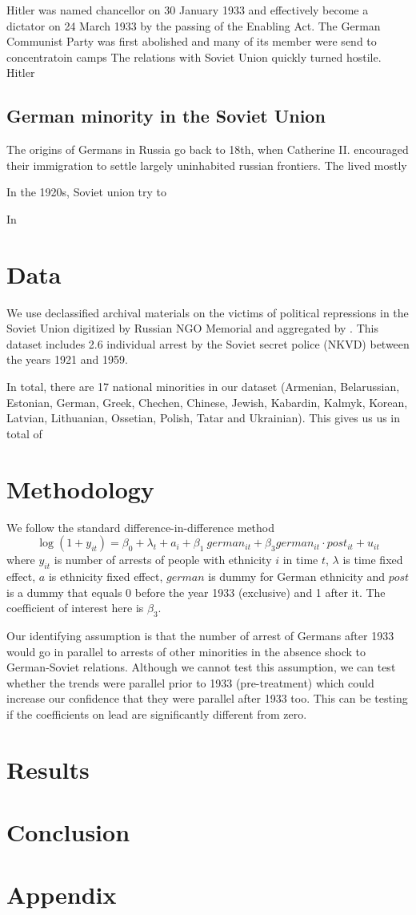 \documentclass[12pt]{article}
\begin{document}
Hitler was named chancellor on 30 January 1933 and effectively become a dictator on 24 March 1933 by the passing of the Enabling Act. The German Communist Party was first abolished and many of its member were send to concentratoin camps
The relations with Soviet Union quickly turned hostile. Hitler 

\subsection{German minority in the Soviet Union}
The origins of Germans in Russia go back to 18th, when Catherine II. encouraged their immigration to settle largely uninhabited russian frontiers. The lived mostly 

In the 1920s, Soviet union try to 

In 
\section{Data}
We use declassified archival materials on the victims of political repressions in the Soviet Union digitized by Russian NGO Memorial and aggregated by \citet{zhukov_stalins_2018}. This dataset includes 2.6 individual arrest by the Soviet secret police (NKVD) between  the years 1921 and 1959.

In total, there are 17 national minorities in our dataset (Armenian, Belarussian, Estonian, German, Greek, Chechen, Chinese, Jewish, Kabardin, Kalmyk, Korean, Latvian, Lithuanian, Ossetian, Polish, Tatar and Ukrainian). This gives us us in total of 
\section{Methodology}
We follow the standard difference-in-difference method
$$ \log\left(1 + y_{it}\right) = \beta_0 +\lambda_t + a_i + \beta_1 \: german_{it} + \beta_3 german_{it} \cdot post_{it} + u_{it} $$
where $y_{it}$ is number of arrests of people with ethnicity $i$ in time $t$, $\lambda$ is time fixed effect, $a$ is ethnicity fixed effect, $german$ is dummy for German ethnicity and $post$ is a dummy that equals 0 before the year 1933 (exclusive) and 1 after it. The coefficient of interest here is $\beta_3$. 

Our identifying assumption is that the number of arrest of Germans after 1933 would go in parallel to arrests of other minorities in the absence shock to German-Soviet relations. Although we cannot test this assumption, we can test whether the trends were parallel prior to 1933 (pre-treatment) which could increase our confidence that they were parallel after 1933 too. This can be testing if the coefficients on lead are significantly different from zero.  
\section{Results}

\section{Conclusion}








\section*{Appendix}
\end{document}
